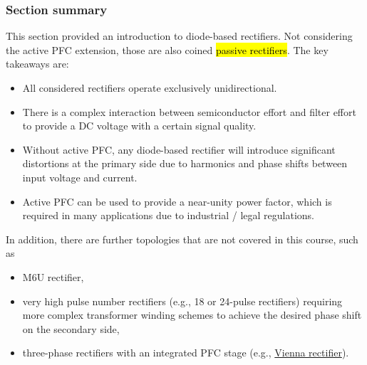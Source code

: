 \begin{frame}
    \frametitle{Section summary}
    This section provided an introduction to diode-based rectifiers. Not considering the active PFC extension, those are also coined \hl{passive rectifiers}. \pause The key takeaways are:
    \begin{itemize}
        \item All considered rectifiers operate exclusively unidirectional.\pause
        \item There is a complex interaction between semiconductor effort and filter effort to provide a DC voltage with a certain signal quality.\pause
        \item Without active PFC, any diode-based rectifier will introduce significant distortions at the primary side due to harmonics and phase shifts between input voltage and current.\pause
        \item Active PFC can be used to provide a near-unity power factor, which is required in many applications due to industrial / legal regulations.\pause
    \end{itemize}\pause
    In addition, there are further topologies that are not covered in this course, such as
    \begin{itemize}
        \item M6U rectifier,
        \item very high pulse number rectifiers (e.g., 18 or 24-pulse rectifiers) requiring more complex transformer winding schemes to achieve the desired phase shift on the secondary side,
        \item three-phase rectifiers with an integrated PFC stage (e.g., \href{https://en.wikipedia.org/wiki/Vienna_rectifier}{Vienna rectifier}).
    \end{itemize}
\end{frame}